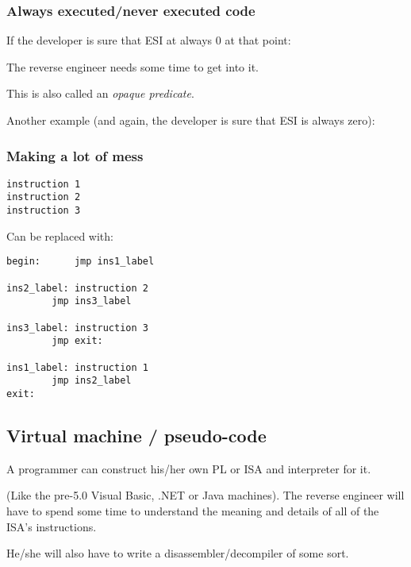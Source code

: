 \subsubsection{Always executed/never executed code}

If the developer is sure that ESI 
at always 0 at that point:



The reverse engineer needs some time to get into it.

This is also called an \emph{opaque predicate}.

Another example (and again, the developer is sure that ESI is always zero):



\subsubsection{Making a lot of mess}

\begin{lstlisting}
instruction 1
instruction 2
instruction 3
\end{lstlisting}

Can be replaced with:

\begin{lstlisting}[style=customasmx86]
begin:		jmp	ins1_label

ins2_label:	instruction 2
		jmp	ins3_label

ins3_label:	instruction 3
		jmp	exit:

ins1_label:	instruction 1
		jmp	ins2_label
exit:
\end{lstlisting}



\subsection{Virtual machine / pseudo-code}

A programmer can construct his/her own \ac{PL} or \ac{ISA} and interpreter for it.

(Like the pre-5.0 Visual Basic, .NET or Java machines).
The reverse engineer will have to spend some time to understand the meaning 
and details of all of the \ac{ISA}'s instructions.

He/she will also have to write a disassembler/decompiler of some sort.

